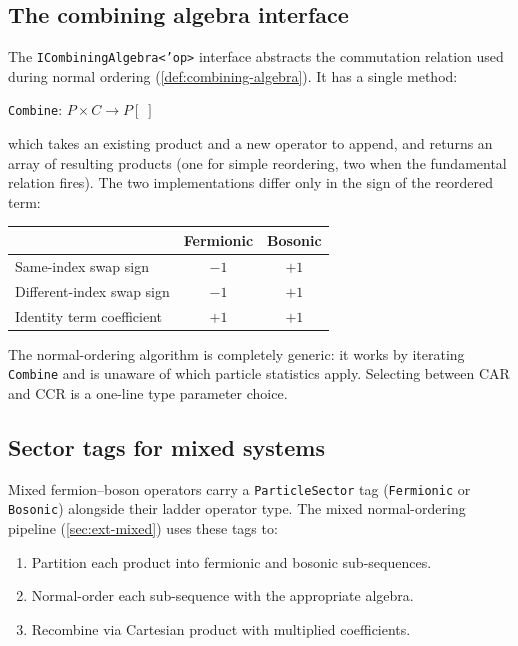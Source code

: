 \subsection*{The combining algebra interface}

The \texttt{ICombiningAlgebra<'op>} interface abstracts the
commutation relation used during normal ordering
(\cref{def:combining-algebra}).  It has a single method:

\begin{center}
\texttt{Combine}: $P \times C \to P[\;]$
\end{center}

\noindent
which takes an existing product and a new operator to append, and
returns an array of resulting products (one for simple reordering,
two when the fundamental relation fires).  The two implementations
differ only in the sign of the reordered term:

\begin{center}
\begin{tabular}{@{}lcc@{}}
\toprule
& \textbf{Fermionic} & \textbf{Bosonic} \\
\midrule
Same-index swap sign & $-1$ & $+1$ \\
Different-index swap sign & $-1$ & $+1$ \\
Identity term coefficient & $+1$ & $+1$ \\
\bottomrule
\end{tabular}
\end{center}

The normal-ordering algorithm is completely generic: it works by
iterating \texttt{Combine} and is unaware of which particle statistics
apply.  Selecting between CAR and CCR is a one-line type parameter
choice.

\subsection*{Sector tags for mixed systems}

Mixed fermion--boson operators carry a \texttt{ParticleSector} tag
(\texttt{Fermionic} or \texttt{Bosonic}) alongside their ladder
operator type.  The mixed normal-ordering pipeline
(\cref{sec:ext-mixed}) uses these tags to:

\begin{enumerate}
  \item Partition each product into fermionic and bosonic
    sub-sequences.
  \item Normal-order each sub-sequence with the appropriate algebra.
  \item Recombine via Cartesian product with multiplied coefficients.
\end{enumerate}

